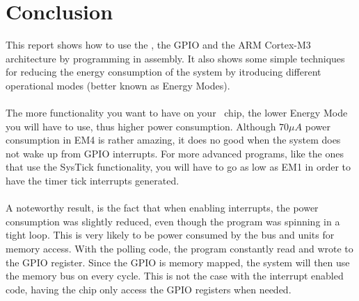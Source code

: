\section{Conclusion}
This report shows how to use the \boardName, the GPIO and the ARM Cortex-M3 architecture by programming in assembly. It also shows some simple techniques for reducing the energy consumption of the system by itroducing different operational modes (better known as Energy Modes). \\
\\
The more functionality you want to have on your \boardName ~chip, the lower Energy Mode you will have to use, thus higher power consumption. Although $70\mu A$ power consumption in EM4 is rather amazing, it does no good when the system does not wake up from GPIO interrupts. For more advanced programs, like the ones that use the SysTick functionality, you will have to go as low as EM1 in order to have the timer tick interrupts generated.\\
\\
A noteworthy result, is the fact that when enabling interrupts, the power consumption was slightly reduced, even though the program was spinning in a tight loop. This is very likely to be power consumed by the bus and units for memory access. With the polling code, the program constantly read and wrote to the GPIO register. Since the GPIO is memory mapped, the system will then use the memory bus on every cycle. This is not the case with the interrupt enabled code, having the chip only access the GPIO registers when needed.

